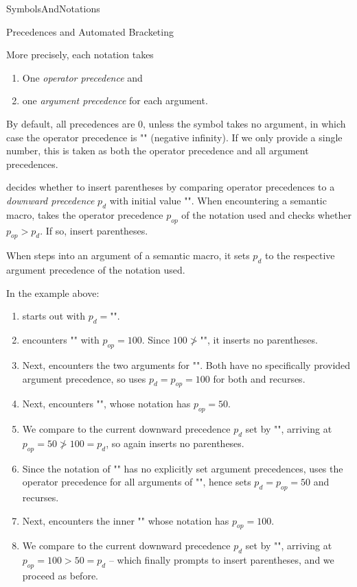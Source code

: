 \begin{smodule}[ns=https://github.com/slatex/sTeX/doc]{SymbolsAndNotations}
\begin{sfragment}{Precedences and Automated Bracketing}
\begin{dangerbox}
  More precisely, each notation takes
  \begin{enumerate}
  \item One \emph{operator precedence} and
  \item one \emph{argument precedence} for each argument.
  \end{enumerate}
  By default, all precedences are $0$, unless the symbol takes no argument, in which case
  the operator precedence is \stexcode"\neginfprec" (negative infinity). If we only
  provide a single number, this is taken as both the operator precedence and all argument
  precedences.

  \sTeX decides whether to insert parentheses by comparing operator precedences to a
  \emph{downward precedence} $p_d$ with initial value \stexcode"\infprec".  When
  encountering a semantic macro, \sTeX takes the operator precedence $p_{op}$ of the
  notation used and checks whether $p_{op}>p_d$. If so, \sTeX insert parentheses.

  When \sTeX steps into an argument of a semantic macro, it sets $p_d$ to the respective
  argument precedence of the notation used.

  In the example above:
  \begin{enumerate}
  \item \sTeX starts out with $p_d=$\stexcode"\infprec".
  \item \sTeX encounters \stexcode"\addition" with $p_{op}=100$. Since
    $100\not>$\stexcode"\infprec", it inserts no parentheses.
  \item Next, \sTeX encounters the two arguments for \stexcode"\addition".  Both have no
    specifically provided argument precedence, so \sTeX uses $p_d=p_{op}=100$ for both and
    recurses.
  \item Next, \sTeX encounters \stexcode"", whose notation has
    $p_{op}=50$.
  \item We compare to the current downward precedence $p_d$ set by \stexcode"\addition",
    arriving at $p_{op}=50\not>100=p_d$, so \sTeX again inserts no parentheses.
  \item Since the notation of \stexcode"\multiplication" has no explicitly set argument
    precedences, \sTeX uses the operator precedence for all arguments of
    \stexcode"\multiplication", hence sets $p_d=p_{op}=50$ and recurses.
  \item Next, \sTeX encounters the inner \stexcode"" whose notation has
    $p_{op}=100$.
  \item We compare to the current downward precedence $p_d$ set by
    \stexcode"\multiplication", arriving at $p_{op}=100>50=p_d$ -- which finally prompts
    \sTeX to insert parentheses, and we proceed as before.
  \end{enumerate}
\end{dangerbox}
\end{sfragment}


\end{smodule}
